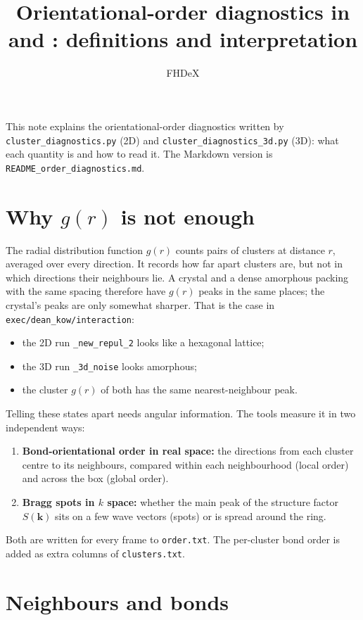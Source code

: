 \documentclass[11pt]{article}
\title{Orientational-order diagnostics in \code{cluster\_diagnostics.py}\\
and \code{cluster\_diagnostics\_3d.py}: definitions and interpretation}
\author{FHDeX}
\date{}
\newcommand{\code}[1]{\texttt{#1}}
\begin{document}
\maketitle

\noindent This note explains the orientational-order diagnostics written by
\code{cluster\_diagnostics.py} (2D) and \code{cluster\_diagnostics\_3d.py} (3D):
what each quantity is and how to read it. The Markdown version is
\code{README\_order\_diagnostics.md}.

\section{\texorpdfstring{Why $g(r)$ is not enough}{Why g(r) is not enough}}

The radial distribution function $g(r)$ counts pairs of clusters at distance
$r$, averaged over every direction. It records how far apart clusters are, but
not in which directions their neighbours lie. A crystal and a dense amorphous
packing with the same spacing therefore have $g(r)$ peaks in the same places;
the crystal's peaks are only somewhat sharper. That is the case in
\code{exec/dean\_kow/interaction}:
\begin{itemize}[nosep]
  \item the 2D run \code{\_new\_repul\_2} looks like a hexagonal lattice;
  \item the 3D run \code{\_3d\_noise} looks amorphous;
  \item the cluster $g(r)$ of both has the same nearest-neighbour peak.
\end{itemize}
Telling these states apart needs angular information. The tools measure it in
two independent ways:
\begin{enumerate}[nosep]
  \item \textbf{Bond-orientational order in real space:} the directions from
        each cluster centre to its neighbours, compared within each
        neighbourhood (local order) and across the box (global order).
  \item \textbf{Bragg spots in $k$ space:} whether the main peak of the
        structure factor $S(\mathbf k)$ sits on a few wave vectors (spots) or
        is spread around the ring.
\end{enumerate}
Both are written for every frame to \code{order.txt}. The per-cluster bond
order is added as extra columns of \code{clusters.txt}.

\section{Neighbours and bonds}
\end{document}
